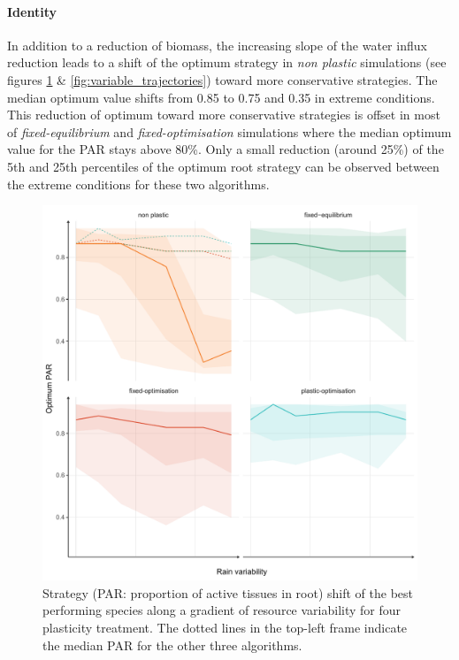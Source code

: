 \paragraph{Identity}

In addition to a reduction of biomass, the increasing slope of the water influx reduction leads to a shift of the optimum strategy in \textit{non plastic} simulations (see figures \ref{fig:variable_strategy} \&  \ref{fig:variable_trajectories}) toward more conservative strategies. The median optimum value shifts from 0.85 to 0.75 and 0.35 in extreme conditions. This reduction of optimum toward more conservative strategies is offset in most of \textit{fixed-equilibrium} and \textit{fixed-optimisation} simulations where the median optimum value for the PAR stays above 80\%. Only a small reduction (around 25\%) of the 5th and 25th percentiles of the optimum root strategy can be observed between the extreme conditions for these two algorithms.

\begin{figure}\label{fig:variable_strategy}
\includegraphics[width = \textwidth]{./2_PP/Figures/Variable/var_strat_trend.pdf}
\caption[Strategy shift along a gradient of resource variability]{Strategy (PAR: proportion of active tissues in root) shift of the best performing species along a gradient of resource variability for four plasticity treatment. The dotted lines in the top-left frame indicate the median PAR for the other three algorithms.}
\end{figure}

